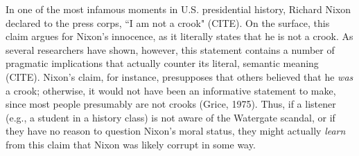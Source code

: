\documentclass[10pt,letterpaper]{article}
\begin{document}

In one of the most infamous moments in U.S. presidential history, Richard Nixon declared to the press corps, ``I am not a crook" (CITE).  On the surface, this claim argues for Nixon's innocence, as it literally states that he is not a crook.  As several researchers have shown, however, this statement contains a number of pragmatic implications that actually counter its literal, semantic meaning (CITE).  Nixon's claim, for instance, presupposes that others believed that he \emph{was} a crook; otherwise, it would not have been an informative statement to make, since most people presumably are not crooks (Grice, 1975).  Thus, if a listener (e.g., a student in a history class) is not aware of the Watergate scandal, or if they have no reason to question Nixon's moral status, they might actually \emph{learn} from this claim that Nixon was likely corrupt in some way.



	

\end{document}
